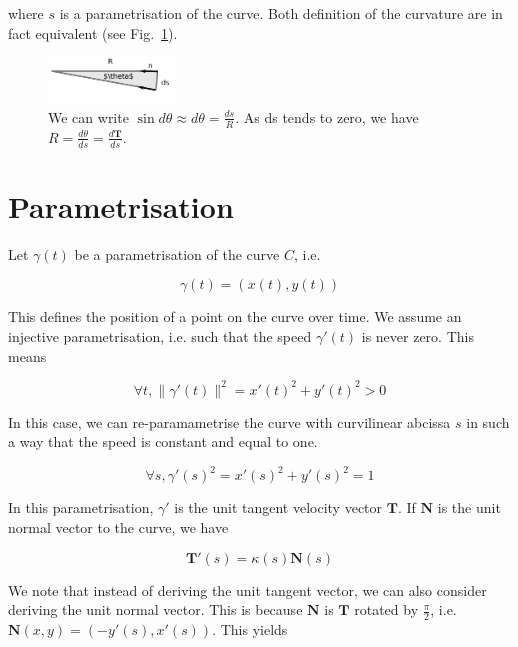 \documentclass[11pt,a4paper]{article}
\begin{document}
	where $s$ is a parametrisation of the curve. Both definition of the curvature
	are in fact equivalent (see Fig.~\ref{fig:theta}). 
	
	\begin{figure}
		\centering
		\includegraphics[width=0.3\textwidth]{Drawings/theta.pdf}
		\caption{We can write $\sin d\theta \approx d\theta = \frac{ds}{R}$. As ds tends to zero, we have $R = \frac{d\theta}{ds} = \frac{d \mathbf{T}}{ds}$.\label{fig:theta}}
	\end{figure}
	
	
	\section*{Parametrisation}
	
	Let $\gamma(t)$ be a parametrisation of the curve $C$, i.e.
	
	\begin{equation}
	\gamma(t) = (x(t),y(t))
	\end{equation}
	
	This defines the position of a point on the curve over time. We assume an injective parametrisation, i.e. such that
	the speed $\gamma'(t)$ is never zero. This means 
	
	\begin{equation}
	\forall t, \|\gamma'(t)\|^2 = x'(t)^2 + y'(t)^2 > 0 
	\end{equation}
	
	In this case, we can re-paramametrise the curve with curvilinear abcissa $s$ in such a way that the speed is constant and equal to one.
	
	\begin{equation}
	\forall s, \gamma'(s)^2 = x'(s)^2 + y'(s)^2 = 1
	\end{equation} 
	
	In this parametrisation, $\gamma'$ is the unit tangent velocity vector $\mathbf{T}$. If $\mathbf{N}$ is the unit normal vector to the curve, we have
	
	\begin{equation}
	\mathbf{T}'(s) = \kappa(s)\mathbf{N}(s)
	\end{equation}
	
	We note that instead of deriving the unit tangent vector, we can also consider deriving the unit normal vector. This is because $\mathbf{N}$ is $\mathbf{T}$ rotated by $\frac{\pi}{2}$, i.e. $\mathbf{N}(x,y) = (-y'(s),x'(s))$. This yields
	
\end{document}
